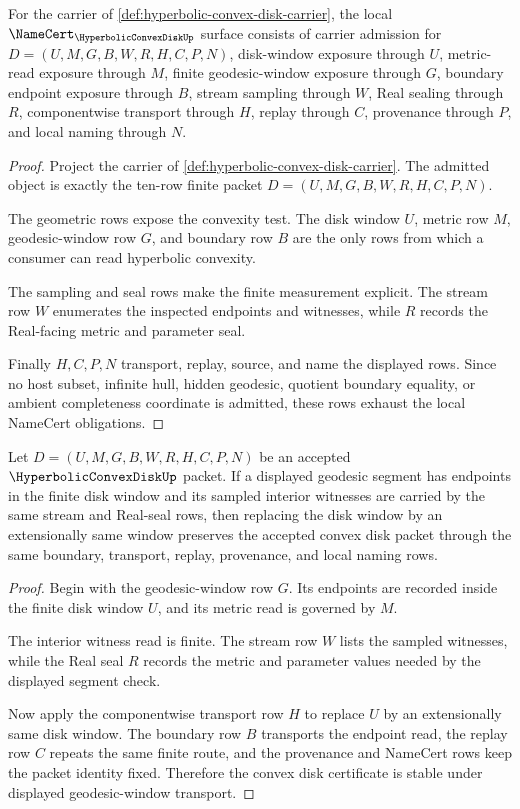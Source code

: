 \begin{theorem}
\label{thm:hyperbolic-convex-disk-namecert-obligations}
For the carrier of \autoref{def:hyperbolic-convex-disk-carrier}, the local $\NameCert_{\HyperbolicConvexDiskUp}$ surface consists of carrier admission for $D=(U,M,G,B,W,R,H,C,P,N)$, disk-window exposure through $U$, metric-read exposure through $M$, finite geodesic-window exposure through $G$, boundary endpoint exposure through $B$, stream sampling through $W$, Real sealing through $R$, componentwise transport through $H$, replay through $C$, provenance through $P$, and local naming through $N$.
\end{theorem}
\begin{proof}
Project the carrier of \autoref{def:hyperbolic-convex-disk-carrier}. The admitted object is exactly the ten-row finite packet $D=(U,M,G,B,W,R,H,C,P,N)$.

The geometric rows expose the convexity test. The disk window $U$, metric row $M$, geodesic-window row $G$, and boundary row $B$ are the only rows from which a consumer can read hyperbolic convexity.

The sampling and seal rows make the finite measurement explicit. The stream row $W$ enumerates the inspected endpoints and witnesses, while $R$ records the Real-facing metric and parameter seal.

Finally $H,C,P,N$ transport, replay, source, and name the displayed rows. Since no host subset, infinite hull, hidden geodesic, quotient boundary equality, or ambient completeness coordinate is admitted, these rows exhaust the local NameCert obligations.
\end{proof}

\begin{theorem}
\label{thm:hyperbolic-convex-disk-geodesic-stability}
Let $D=(U,M,G,B,W,R,H,C,P,N)$ be an accepted $\HyperbolicConvexDiskUp$ packet. If a displayed geodesic segment has endpoints in the finite disk window and its sampled interior witnesses are carried by the same stream and Real-seal rows, then replacing the disk window by an extensionally same window preserves the accepted convex disk packet through the same boundary, transport, replay, provenance, and local naming rows.
\end{theorem}
\begin{proof}
Begin with the geodesic-window row $G$. Its endpoints are recorded inside the finite disk window $U$, and its metric read is governed by $M$.

The interior witness read is finite. The stream row $W$ lists the sampled witnesses, while the Real seal $R$ records the metric and parameter values needed by the displayed segment check.

Now apply the componentwise transport row $H$ to replace $U$ by an extensionally same disk window. The boundary row $B$ transports the endpoint read, the replay row $C$ repeats the same finite route, and the provenance and NameCert rows keep the packet identity fixed. Therefore the convex disk certificate is stable under displayed geodesic-window transport.
\end{proof}

